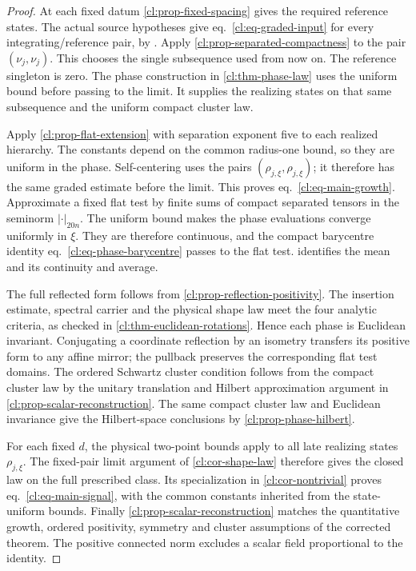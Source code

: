 \documentclass[11pt,letterpaper,reqno]{amsart}
\numberwithin{equation}{section}
\renewcommand{\eqref}[1]{\textup{eq.~\ref{#1}}}
\theoremstyle{definition}
\theoremstyle{remark}
\begin{document}
\begin{proof}
At each fixed datum \cref{cl:prop-fixed-spacing} gives
the required reference states. The actual source
hypotheses give \eqref{cl:eq-graded-input} for every
integrating/reference pair, by \cite[Theorem~B]{SI}.
Apply \cref{cl:prop-separated-compactness} to the pair
\((\nu_j,\nu_j)\). This chooses the single subsequence
used from now on. The reference singleton is zero.
The phase construction in \cref{cl:thm-phase-law}
uses the uniform bound before passing to the limit.
It supplies the realizing states on that same
subsequence and the uniform compact cluster law.

Apply \cref{cl:prop-flat-extension} with separation
exponent five to each realized hierarchy. The
constants depend on the common radius-one bound,
so they are uniform in the phase. Self-centering
uses the pairs \((\rho_{j,\xi},\rho_{j,\xi})\);
it therefore has the same graded estimate before
the limit. This proves \eqref{cl:eq-main-growth}.
Approximate a fixed flat test by finite sums of compact separated tensors
in the seminorm \(|\cdot|_{20n}\). The uniform bound makes
the phase evaluations converge uniformly in \(\xi\).
They are therefore continuous, and the compact barycentre
identity \eqref{cl:eq-phase-barycentre} passes to the flat test.
 identifies the mean and
its continuity and average.

The full reflected form follows from
\cref{cl:prop-reflection-positivity}. The insertion
estimate, spectral carrier and the physical shape
law meet the four analytic criteria, as checked in
\cref{cl:thm-euclidean-rotations}. Hence each phase
is Euclidean invariant. Conjugating a coordinate
reflection by an isometry transfers its positive
form to any affine mirror; the pullback preserves
the corresponding flat test domains.
The ordered Schwartz cluster condition follows
from the compact cluster law by the unitary
translation and Hilbert approximation argument
in \cref{cl:prop-scalar-reconstruction}.
The same compact cluster law and Euclidean invariance give
the Hilbert-space conclusions by \cref{cl:prop-phase-hilbert}.

For each fixed \(d\), the physical two-point bounds apply to all
late realizing states \(\rho_{j,\xi}\).
The fixed-pair limit argument of \cref{cl:cor-shape-law}
therefore gives the closed law on the full prescribed class.
Its specialization in \cref{cl:cor-nontrivial}
proves \eqref{cl:eq-main-signal}, with the common
constants inherited from the state-uniform bounds.
Finally \cref{cl:prop-scalar-reconstruction}
matches the quantitative growth, ordered
positivity, symmetry and cluster assumptions of
the corrected theorem. The positive connected
norm excludes a scalar field proportional to
the identity.
\end{proof}
\end{document}
